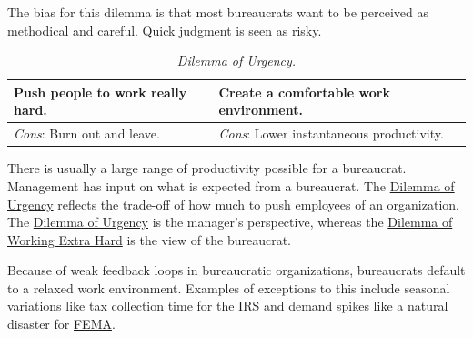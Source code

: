 The bias for this dilemma is that most bureaucrats want to be perceived as methodical and careful. Quick judgment is seen as risky. 


\begin{center}
\begin{table}[H] %
\begin{tabular}{ | m{\dilemmatablewidth}| m{\dilemmatablewidth} | } 
  \hline
  \textbf{Push people to work really hard.} & 
  \textbf{Create a comfortable work environment.} \\ 
  \hline
  \textit{Cons}: Burn out and leave. & 
  \textit{Cons}: Lower instantaneous productivity. \\  
  \hline
\end{tabular}
\caption{
\textit{Dilemma of Urgency.}
}
\label{table:dilemma-personal-manager-rate-of-work}
\end{table}
\end{center}

There is usually a large range of productivity possible for a bureaucrat. Management has input on what is expected from 
 a bureaucrat. The 
\hyperref[table:dilemma-personal-manager-rate-of-work]{Dilemma of Urgency} reflects the trade-off of how much to push employees of an organization. The \hyperref[table:dilemma-personal-manager-rate-of-work]{Dilemma of Urgency} is the manager's perspective, whereas the
\hyperref[table:dilemma-personal-work-extra-or-work-as-expected]{Dilemma of Working Extra Hard}
is the view of the bureaucrat. 


Because of weak feedback loops in bureaucratic organizations, bureaucrats default to a relaxed work environment. Examples of exceptions to this include seasonal variations like tax collection time for the \href{https://en.wikipedia.org/wiki/Internal_Revenue_Service}{IRS} 
and demand spikes like a natural disaster for \href{https://en.wikipedia.org/wiki/Federal_Emergency_Management_Agency}{FEMA}. 

